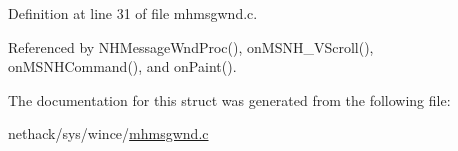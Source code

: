 Definition at line 31 of file mhmsgwnd.\+c.



Referenced by N\+H\+Message\+Wnd\+Proc(), on\+M\+S\+N\+H\+\_\+\+V\+Scroll(), on\+M\+S\+N\+H\+Command(), and on\+Paint().



The documentation for this struct was generated from the following file\+:\begin{DoxyCompactItemize}
\item 
nethack/sys/wince/\hyperlink{sys_2wince_2mhmsgwnd_8c}{mhmsgwnd.\+c}\end{DoxyCompactItemize}
